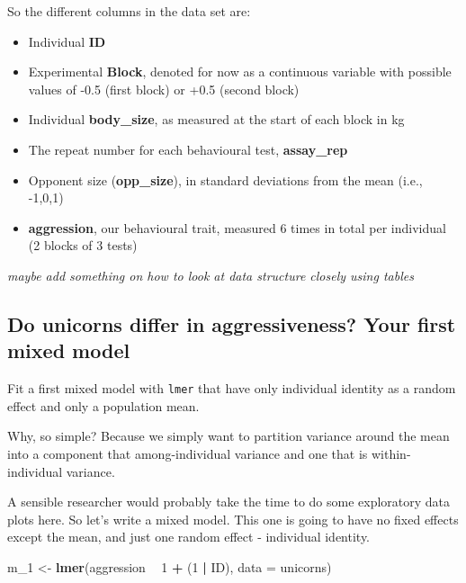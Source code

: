 \documentclass[
  12pt,
]{book}
\newenvironment{Shaded}{\begin{snugshade}}{\end{snugshade}}
\newcommand{\DataTypeTok}[1]{\textcolor[rgb]{0.13,0.29,0.53}{#1}}
\newcommand{\DecValTok}[1]{\textcolor[rgb]{0.00,0.00,0.81}{#1}}
\newcommand{\KeywordTok}[1]{\textcolor[rgb]{0.13,0.29,0.53}{\textbf{#1}}}
\newcommand{\NormalTok}[1]{#1}
\newcommand{\OperatorTok}[1]{\textcolor[rgb]{0.81,0.36,0.00}{\textbf{#1}}}
\newcommand{\StringTok}[1]{\textcolor[rgb]{0.31,0.60,0.02}{#1}}
\providecommand{\tightlist}{%
  \setlength{\itemsep}{0pt}\setlength{\parskip}{0pt}}
\begin{document}
So the different columns in the data set are:

\begin{itemize}
\tightlist
\item
  Individual \textbf{ID}
\item
  Experimental \textbf{Block}, denoted for now as a continuous variable with possible values of -0.5 (first block) or +0.5 (second block)
\item
  Individual \textbf{body\_size}, as measured at the start of each block in kg
\item
  The repeat number for each behavioural test, \textbf{assay\_rep}
\item
  Opponent size (\textbf{opp\_size}), in standard deviations from the mean (i.e., -1,0,1)
\item
  \textbf{aggression}, our behavioural trait, measured 6 times in total per individual (2 blocks of 3 tests)
\end{itemize}

\emph{maybe add something on how to look at data structure closely using tables}

\hypertarget{do-unicorns-differ-in-aggressiveness-your-first-mixed-model}{%
\subsection{Do unicorns differ in aggressiveness? Your first mixed model}\label{do-unicorns-differ-in-aggressiveness-your-first-mixed-model}}

Fit a first mixed model with \texttt{lmer} that have only individual identity as a random effect and only a population mean.

Why, so simple? Because we simply want to partition variance around the mean into a component that among-individual variance and one that is within-individual variance.

A sensible researcher would probably take the time to do some exploratory data plots here. So let's write a mixed model. This one is going to have no fixed effects except the mean, and just one random effect - individual identity.

\begin{Shaded}
\begin{Highlighting}[]
\NormalTok{m_}\DecValTok{1}\NormalTok{ <-}\StringTok{ }\KeywordTok{lmer}\NormalTok{(aggression }\OperatorTok{~}\StringTok{ }\DecValTok{1} \OperatorTok{+}\StringTok{  }\NormalTok{(}\DecValTok{1} \OperatorTok{|}\StringTok{ }\NormalTok{ID), }\DataTypeTok{data =}\NormalTok{ unicorns)}
\end{Highlighting}
\end{Shaded}
\end{document}
